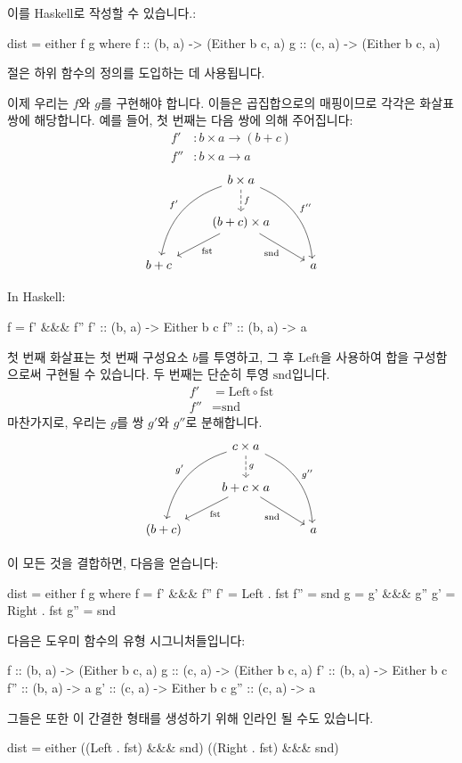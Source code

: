 \documentclass[DaoFP]{subfiles}
\begin{document}
이를 Haskell로 작성할 수 있습니다.:
\begin{haskell}
dist = either f g
  where
    f   :: (b, a) -> (Either b c, a)
    g   :: (c, a) -> (Either b c, a)
\end{haskell}
 절은 하위 함수의 정의를 도입하는 데 사용됩니다.

이제 우리는 $f$와 $g$를 구현해야 합니다. 이들은 곱집합으로의 매핑이므로 각각은 화살표 쌍에 해당합니다. 예를 들어, 첫 번째는 다음 쌍에 의해 주어집니다:
\begin{align*}
f' &\colon b \times a \to (b + c) \\
f'' &\colon b \times a \to  a
\end{align*}
\[
 \begin{tikzcd}
 & b \times a
\arrow[d, dashed, "f"]
 \arrow[ddl, bend right, "f'"']
 \arrow[ddr, bend left, "f''"]
\\
& (b + c) \times a
 \arrow[dl,  "\text{fst}"]
  \arrow[dr,   "\text{snd}"']
\\
b + c && a
 \end{tikzcd}
\]

In Haskell:
\begin{haskell}
    f = f' &&& f''
    f'  :: (b, a) -> Either b c
    f'' :: (b, a) -> a
\end{haskell}
첫 번째 화살표는 첫 번째 구성요소 $b$를 투영하고, 그 후 $\text{Left}$을 사용하여 합을 구성함으로써 구현될 수 있습니다. 두 번째는 단순히 투영 $\text{snd}$입니다.
\begin{align*}
 f' &= \text{Left} \circ \text{fst} \\
 f'' &= \text{snd}
\end{align*}
마찬가지로, 우리는 $g$를 쌍 $g'$와 $g''$로 분해합니다.
\[
 \begin{tikzcd}
 & c \times a
\arrow[d, dashed, "g"]
 \arrow[ddl, bend right, "g'"']
 \arrow[ddr, bend left, "g''"]
\\
& b + c \times a
 \arrow[dl,  "\text{fst}"]
  \arrow[dr,   "\text{snd}"']
\\
(b + c) && a
 \end{tikzcd}
\]

이 모든 것을 결합하면, 다음을 얻습니다:
\begin{haskell}
dist = either f g
  where
    f   = f' &&& f''
    f'  = Left . fst
    f'' = snd
    g   = g' &&& g''
    g'  = Right . fst
    g'' = snd
\end{haskell}
다음은 도우미 함수의 유형 시그니처들입니다:
\begin{haskell}
    f   :: (b, a) -> (Either b c, a)
    g   :: (c, a) -> (Either b c, a)
    f'  :: (b, a) -> Either b c
    f'' :: (b, a) -> a
    g'  :: (c, a) -> Either b c
    g'' :: (c, a) -> a
\end{haskell}
그들은 또한 이 간결한 형태를 생성하기 위해 인라인 될 수도 있습니다.
\begin{haskell}
dist = either ((Left . fst) &&& snd) ((Right . fst) &&& snd)
\end{haskell}
\end{document}

